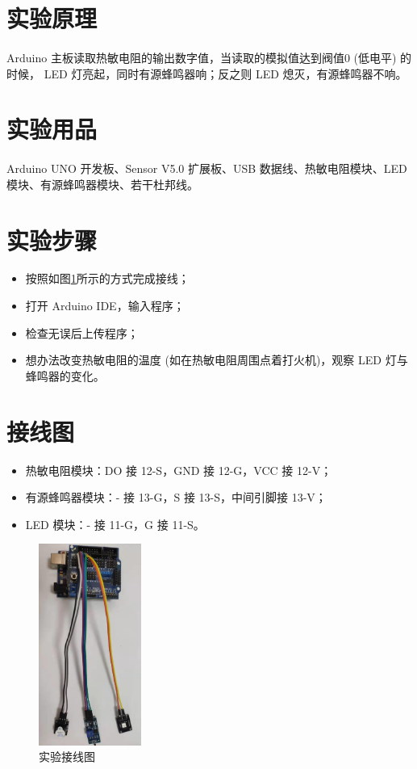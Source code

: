 \documentclass[UTF8, oneside]{ctexbook}
\begin{document}
\section{实验原理}
\paragraph{}
Arduino 主板读取热敏电阻的输出数字值，当读取的模拟值达到阀值0 (低电平) 的时候，
LED 灯亮起，同时有源蜂鸣器响；反之则 LED 熄灭，有源蜂鸣器不响。

\section{实验用品}
\paragraph{}
Arduino UNO 开发板、Sensor V5.0 扩展板、USB 数据线、热敏电阻模块、LED 模块、有源蜂鸣器模块、若干杜邦线。

\section{实验步骤}
\begin{itemize}
    \item[(1)] 按照如图\ref{s14_line}所示的方式完成接线；
    \item[(2)] 打开 Arduino IDE，输入程序；
    \item[(3)] 检查无误后上传程序；
    \item[(4)] 想办法改变热敏电阻的温度 (如在热敏电阻周围点着打火机)，观察 LED 灯与蜂鸣器的变化。
\end{itemize}

\section{接线图}
\begin{itemize}
    \item 热敏电阻模块：DO 接 12-S，GND 接 12-G，VCC 接 12-V；
    \item 有源蜂鸣器模块：- 接 13-G，S 接 13-S，中间引脚接 13-V；
    \item LED 模块：- 接 11-G，G 接 11-S。
\end{itemize}
\begin{figure}[h]
    \centering
    \includegraphics[width=0.3\textwidth]{./result/sensor/14/lines2.png}
    \caption{实验接线图}
    \label{s14_line}
\end{figure}
\end{document}
